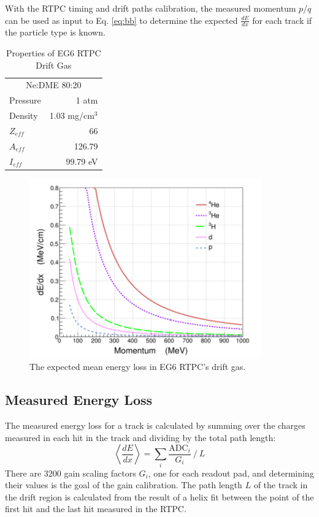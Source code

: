 \documentclass[amsmath,amssymb,notitlepage,12pt]{revtex4-1}
\begin{document}
With the RTPC timing and drift paths calibration, the measured momentum $p/q$ can be used as input to Eq. \ref{eq:bb} to determine the expected $\frac{dE}{dx}$ for each track if the particle type is known.
\begin{table}[tbp]
    \caption{\label{tab:gasprop}Properties of EG6 RTPC Drift Gas}
    \begin{tabular}{p{4cm}r}
    \toprule[1.5pt]
    \multicolumn{2}{c}{Ne:DME 80:20} \\ \cmidrule[0.5pt]{1-2}
    Pressure & 1 atm \\
    Density & 1.03 mg/cm$^3$\\
    $Z_{eff}$ & 66 \\
    $A_{eff}$ & 126.79 \\
    $I_{eff}$ & 99.79 eV\\
    \bottomrule[1.5pt]
\end{tabular}
\end{table}
\begin{figure}[tbp]\centering
    \includegraphics[width=10cm]{bb_small.png}
    \caption{The expected mean energy loss in EG6 RTPC's drift gas.\label{fig:bb}}
\end{figure}

\subsection{Measured Energy Loss}\label{sec:measureddedx}
The measured energy loss for a track is calculated by summing over the charges measured in each hit in the track and dividing by the total path length:
\begin{equation}
    \left\langle\frac{dE}{dx}\right\rangle = \sum_{i} \frac{\textrm{ADC}_{i}}{G_{i}}\ /\ L
    \label{eq:dedxmeas}
\end{equation}
There are 3200 gain scaling factors $G_i$, one for each readout pad, and determining their values is the goal of the gain calibration.
The path length $L$ of the track in the drift region is calculated from the result of a helix fit between the point of the first hit and the last hit measured in the RTPC. 
\end{document}
